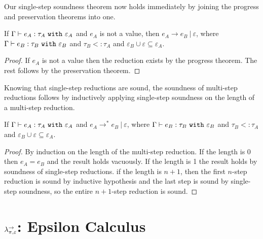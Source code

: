 Our single-step soundness theorem now holds immediately by joining the progress and preservation theorems into one.

\begin{theorem}[Soundness]
If $ \Gamma \vdash  e_A:  \tau_A~\mathtt{with}~ \varepsilon_A$ and $ e_A$ is not a value, then $e_A \longrightarrow e_B~|~\varepsilon$, where $ \Gamma \vdash e_B:  \tau_B~\mathtt{with}~ \varepsilon_B$ and $ \tau_B <:  \tau_A$ and $\varepsilon_B \cup \varepsilon \subseteq \varepsilon_A$.
\end{theorem}
\begin{proof}
If $ e_A$ is not a value then the reduction exists by the progress theorem. The rest follows by the preservation theorem.
\end{proof}

Knowing that single-step reductions are sound, the soundness of multi-step reductions follows by inductively applying single-step soundness on the length of a multi-step reduction.

\begin{theorem}
If $ \Gamma \vdash  e_A:  \tau_A~\mathtt{with}~ \varepsilon_A$ and $e_A \longrightarrow^{*} e_B~|~\varepsilon$, where $\Gamma \vdash e_B: \tau_B~\mathtt{with}~ \varepsilon_B$ and $ \tau_B <: \tau_A$ and $\varepsilon_B \cup \varepsilon \subseteq \varepsilon_A$.
\end{theorem}

\begin{proof} By induction on the length of the multi-step reduction. If the length is 0 then $e_A = e_B$ and the result holds vacuously. If the length is 1 the result holds by soundness of single-step reductions. if the length is $n+1$, then the first $n$-step reduction is sound by inductive hypothesis and the last step is sound by single-step soundness, so the entire $n+1$-step reduction is sound.
\end{proof}


























\section{$\lambda^{\rightarrow}_{\pi, \varepsilon}$: Epsilon Calculus}


